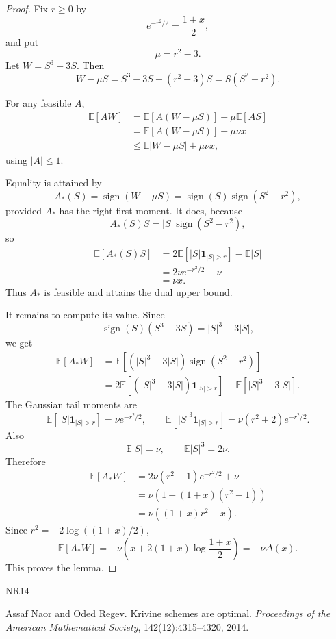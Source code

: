 \documentclass[11pt]{article}
\numberwithin{equation}{section}
\newcommand{\E}{\mathbb E}
\newcommand{\one}{\mathbf 1}
\newcommand{\sgn}{\operatorname{sign}}
\begin{document}
\begin{proof}
Fix $r\ge0$ by
\[
        e^{-r^2/2}=\frac{1+x}{2},
\]
and put
\[
        \mu=r^2-3.
\]
Let $W=S^3-3S$. Then
\[
        W-\mu S=S^3-3S-(r^2-3)S=S(S^2-r^2).
\]

For any feasible $A$,
\begin{align*}
        \E[AW]
        &=\E[A(W-\mu S)]+\mu\E[AS]\\
        &=\E[A(W-\mu S)]+\mu\nu x\\
        &\le \E|W-\mu S|+\mu\nu x,
\end{align*}
using $|A|\le1$.

Equality is attained by
\[
        A_*(S)=\sgn(W-\mu S)=\sgn(S)\sgn(S^2-r^2),
\]
provided $A_*$ has the right first moment. It does, because
\[
        A_*(S)S=|S|\sgn(S^2-r^2),
\]
so
\begin{align*}
        \E[A_*(S)S]
        &=2\E[|S|\one_{|S|>r}]-\E|S|\\
        &=2\nu e^{-r^2/2}-\nu\\
        &=\nu x.
\end{align*}
Thus $A_*$ is feasible and attains the dual upper bound.

It remains to compute its value. Since
\[
        \sgn(S)(S^3-3S)=|S|^3-3|S|,
\]
we get
\begin{align*}
        \E[A_*W]
        &=\E[(|S|^3-3|S|)\sgn(S^2-r^2)]\\
        &=2\E[(|S|^3-3|S|)\one_{|S|>r}]
          -\E[|S|^3-3|S|].
\end{align*}
The Gaussian tail moments are
\[
        \E[|S|\one_{|S|>r}]=\nu e^{-r^2/2},
        \qquad
        \E[|S|^3\one_{|S|>r}]=\nu(r^2+2)e^{-r^2/2}.
\]
Also
\[
        \E|S|=\nu,
        \qquad
        \E|S|^3=2\nu.
\]
Therefore
\begin{align*}
        \E[A_*W]
        &=2\nu(r^2-1)e^{-r^2/2}+\nu\\
        &=\nu\left(1+(1+x)(r^2-1)\right)\\
        &=\nu\left((1+x)r^2-x\right).
\end{align*}
Since $r^2=-2\log((1+x)/2)$,
\[
        \E[A_*W]
        =-\nu\left(x+2(1+x)\log\frac{1+x}{2}\right)
        =-\nu\Delta(x).
\]
This proves the lemma.
\end{proof}


\begin{thebibliography}{NR14}

Assaf Naor and Oded Regev.
\newblock Krivine schemes are optimal.
\newblock \emph{Proceedings of the American Mathematical Society},
  142(12):4315--4320, 2014.

\end{thebibliography}
\end{document}
